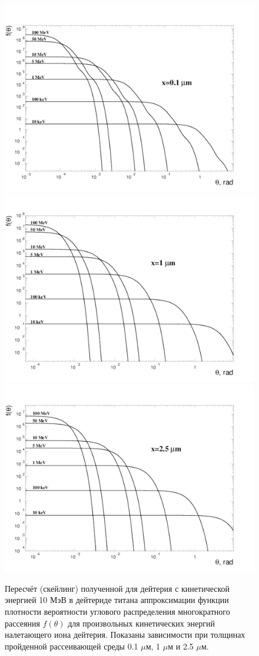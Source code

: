 \documentclass[a4paper,12pt]{article}
\begin{document}
\begin{large}
	
\begin{figure}[ht]
{
   \includegraphics[width=0.32\linewidth]{images/funtheta_0_1mkm_deuteron.pdf}
   \includegraphics[width=0.32\linewidth]{images/funtheta_1mkm_deuteron.pdf}
   \includegraphics[width=0.32\linewidth]{images/funtheta_2_5mkm_deuteron.pdf}
}
\caption{Пересчёт (скейлинг) полученной для дейтерия с кинетической энергией 10 МэВ в дейтериде титана аппроксимации функции плотности вероятности углового распределения многократного рассеяния $f(\theta)$ для произвольных кинетических энергий налетающего иона дейтерия.
	Показаны зависимости при толщинах пройденной рассеивающей среды 0.1 $\mu$м, 1 $\mu$м и 2.5 $\mu$м.}
\label{fig:MFthetaScalingDeuteron}
\end{figure}


\end{large}
\end{document}
